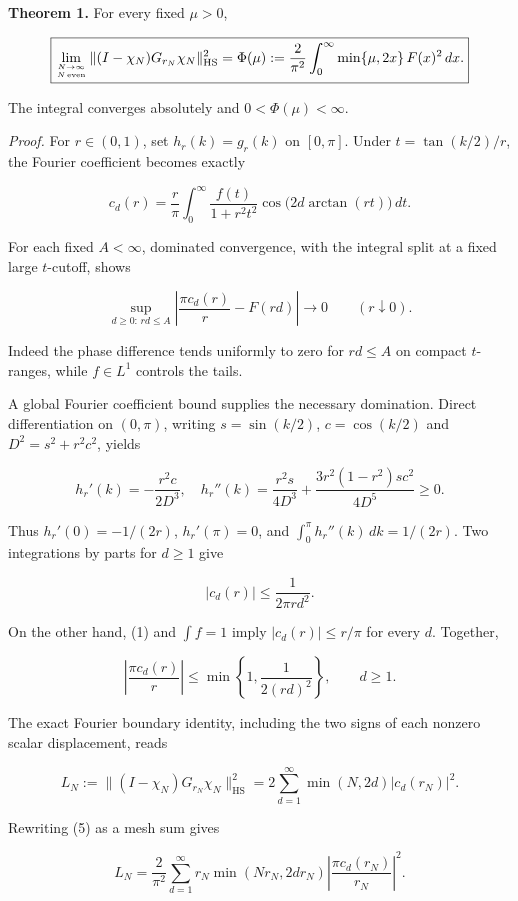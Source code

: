 \documentclass[
  10pt,
  a4paper,
]{article}
\begin{document}
\textbf{Theorem 1.} For every fixed \(\mu>0\),

\[
\boxed{
\lim_{N\to\infty\atop N\,\mathrm{even}}
\|(I-\chi_N)G_{r_N}\chi_N\|_{\mathrm{HS}}^2
=\Phi(\mu)
:=\frac{2}{\pi^2}\int_0^\infty
\min\{\mu,2x\}\,F(x)^2\,dx.
}
\]

The integral converges absolutely and \(0<\Phi(\mu)<\infty\).

\emph{Proof.} For \(r\in(0,1)\), set \(h_r(k)=g_r(k)\) on \([0,\pi]\). Under \(t=\tan(k/2)/r\), the Fourier coefficient becomes exactly

\[
 c_d(r)=\frac r\pi\int_0^\infty
 \frac{f(t)}{1+r^2t^2}\cos\bigl(2d\arctan(rt)\bigr)\,dt.
 \tag{1}
\]

For each fixed \(A<\infty\), dominated convergence, with the integral split at a fixed large \(t\)-cutoff, shows

\[
\sup_{d\ge0:\,rd\le A}
\left|\frac{\pi c_d(r)}r-F(rd)\right|\longrightarrow0
\qquad(r\downarrow0).
\tag{2}
\]

Indeed the phase difference tends uniformly to zero for \(rd\le A\) on compact \(t\)-ranges, while \(f\in L^1\) controls the tails.

A global Fourier coefficient bound supplies the necessary domination. Direct differentiation on \((0,\pi)\), writing \(s=\sin(k/2)\), \(c=\cos(k/2)\) and \(D^2=s^2+r^2c^2\), yields

\[
 h_r'(k)=-\frac{r^2c}{2D^3},\quad
 h_r''(k)=\frac{r^2s}{4D^3}
 +\frac{3r^2(1-r^2)sc^2}{4D^5}\ge0.
\]

Thus \(h_r'(0)=-1/(2r)\), \(h_r'(\pi)=0\), and \(\int_0^\pi h_r''(k)\,dk=1/(2r)\). Two integrations by parts for \(d\ge1\) give

\[
\left|c_d(r)\right|
\le \frac{1}{2\pi r d^2}.
\tag{3}
\]

On the other hand, (1) and \(\int f=1\) imply \(|c_d(r)|\le r/\pi\) for every \(d\). Together,

\[
\boxed{
\left|\frac{\pi c_d(r)}r\right|
\le\min\left\{1,\frac1{2(rd)^2}\right\},\qquad d\ge1.
}
\tag{4}
\]

The exact Fourier boundary identity, including the two signs of each nonzero scalar displacement, reads

\[
 L_N:=\|(I-\chi_N)G_{r_N}\chi_N\|_{\mathrm{HS}}^2
 =2\sum_{d=1}^\infty\min(N,2d)|c_d(r_N)|^2.
 \tag{5}
\]

Rewriting (5) as a mesh sum gives

\[
 L_N=\frac2{\pi^2}\sum_{d=1}^\infty r_N
 \min(Nr_N,2dr_N)\left|\frac{\pi c_d(r_N)}{r_N}\right|^2.
\]
\end{document}
